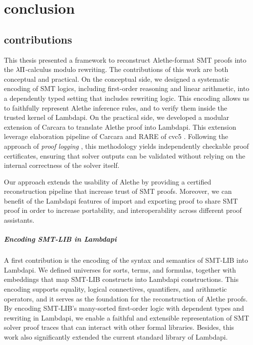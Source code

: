 \chapter{conclusion}\label{ch:conclusion}

\section{contributions}
This thesis presented a framework to reconstruct Alethe-format SMT proofs into the $\lambda\Pi$-calculus modulo rewriting.
The contributions of this work are both conceptual and practical.
On the conceptual side, we designed a systematic encoding of SMT logics, including first-order reasoning and linear arithmetic, into a dependently typed setting that includes rewriting logic.
This encoding allows us to faithfully represent Alethe inference rules, and to verify them inside the trusted kernel of Lambdapi.
On the practical side, we developed a modular extension of Carcara \cite{carcara} to translate Alethe proof into Lambdapi. This extension leverage elaboration pipeline of Carcara and RARE \cite{rare} of cvc5 \cite{cvc5}.
Following the approach of \emph{proof logging} \cite{proof-logging}, this methodology yields independently checkable proof certificates, ensuring that solver outputs can be validated without relying on the internal correctness of the solver itself.

Our approach extends the usability of Alethe by providing a certified reconstruction pipeline that increase trust of SMT proofs.
Moreover, we can benefit of the Lambdapi features of import and exporting proof \cite{blanqui:hal-04613926} to share SMT proof in order to increase portability, and interoperability across different proof assistants.


\paragraph{Encoding SMT-LIB in Lambdapi}
A first contribution is the encoding of the syntax and semantics of SMT-LIB into Lambdapi.
We defined universes for sorts, terms, and formulas, together with embeddings that map SMT-LIB constructs into Lambdapi constructions.
This encoding supports equality, logical connectives, quantifiers, and arithmetic operators, and it serves as the foundation for the reconstruction of Alethe proofs.
By encoding SMT-LIB's many-sorted first-order logic with dependent types and rewriting in Lambdapi, we enable a faithful and extensible representation of SMT solver proof traces that can interact with other formal libraries.
Besides, this work also significantly extended the current standard library of Lambdapi.


